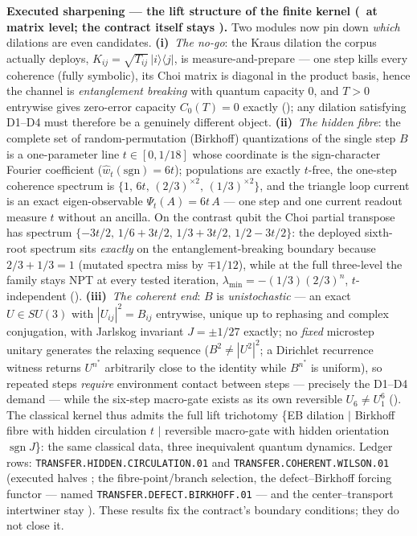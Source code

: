\par\smallskip\noindent\textbf{Executed sharpening --- the lift structure of the finite kernel
(\mE\ at matrix level; the contract itself stays \mO).}  Two modules now pin down \emph{which}
dilations are even candidates.  \textbf{(i)}~\emph{The no-go}: the Kraus dilation the corpus
actually deploys, $K_{ij}=\sqrt{T_{ij}}\,|i\rangle\langle j|$, is measure-and-prepare --- one
step kills every coherence (fully symbolic), its Choi matrix is diagonal in the product basis,
hence the channel is \emph{entanglement breaking} with quantum capacity $0$, and $T>0$
entrywise gives zero-error capacity $C_0(T)=0$ exactly
(); any dilation satisfying D1--D4 must therefore be a
genuinely different object.  \textbf{(ii)}~\emph{The hidden fibre}: the complete set of
random-permutation (Birkhoff) quantizations of the single step $B$ is a one-parameter line
$t\in[0,1/18]$ whose coordinate is the sign-character Fourier coefficient
($\widehat w_t(\mathrm{sgn})=6t$); populations are exactly $t$-free, the one-step coherence
spectrum is $\{1,\,6t,\,(2/3)^{\times2},\,(1/3)^{\times2}\}$, and the triangle loop current is
an exact eigen-observable $\Psi_t(A)=6t\,A$ --- one step and one current readout measure $t$
without an ancilla.  On the contrast qubit the Choi partial transpose has spectrum
$\{-3t/2,\,1/6+3t/2,\,1/3+3t/2,\,1/2-3t/2\}$: the deployed sixth-root spectrum sits
\emph{exactly} on the entanglement-breaking boundary because $2/3+1/3=1$ (mutated spectra miss
by $\mp1/12$), while at the full three-level the family stays NPT at every tested iteration,
$\lambda_{\min}=-(1/3)(2/3)^n$, $t$-independent ().
\textbf{(iii)}~\emph{The coherent end}: $B$ is \emph{unistochastic} --- an exact $U\in SU(3)$
with $|U_{ij}|^2=B_{ij}$ entrywise, unique up to rephasing and complex conjugation, with
Jarlskog invariant $J=\pm1/27$ exactly; no \emph{fixed} microstep unitary generates the
relaxing sequence ($B^2\neq|U^2|^2$; a Dirichlet recurrence witness returns $U^{n^*}$
arbitrarily close to the identity while $B^{n^*}$ is uniform), so repeated steps
\emph{require} environment contact between steps --- precisely the D1--D4 demand --- while the
six-step macro-gate exists as its own reversible $U_6\neq U_1^6$
().  The classical kernel thus admits the full
lift trichotomy \{EB dilation $\mid$ Birkhoff fibre with hidden circulation $t$ $\mid$
reversible macro-gate with hidden orientation $\operatorname{sgn}J$\}: the same classical
data, three inequivalent quantum dynamics.  Ledger rows:
\texttt{TRANSFER.HIDDEN.CIRCULATION.01} and \texttt{TRANSFER.COHERENT.WILSON.01} (executed
halves \mE; the fibre-point/branch selection, the defect--Birkhoff forcing functor --- named
\texttt{TRANSFER.DEFECT.BIRKHOFF.01} --- and the center--transport intertwiner stay \mO).
These results fix the contract's boundary conditions; they do not close it.

